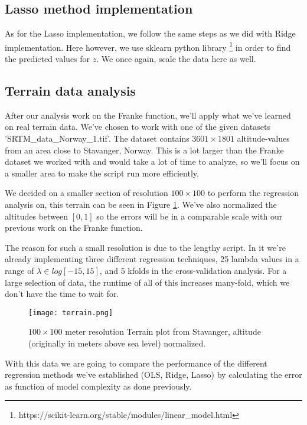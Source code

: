 \documentclass[reprint,english,notitlepage]{revtex4-1}  %
\begin{document}
\subsection{Lasso method implementation}
As for the Lasso implementation, we follow the same steps as we did with Ridge implementation. Here however, we use sklearn python library \footnote{https://scikit-learn.org/stable/modules/linear_model.html} in order to find the predicted values for $z$. We once again, scale the data here as well. 

\subsection{Terrain data analysis}

After our analysis work on the Franke function, we'll apply what we've learned on real terrain data. We've chosen to work with one of the given datasets 'SRTM\_data\_Norway\_1.tif'. The dataset contains $3601 \times 1801$ altitude-values from an area close to Stavanger, Norway. This is a lot larger than the Franke dataset we worked with and would take a lot of time to analyze, so we'll focus on a smaller area to make the script run more efficiently.

We decided on a smaller section of resolution $100 \times 100$ to perform the regression analysis on, this terrain can be seen in Figure \ref{fig:terrain}. We've also normalized the altitudes between $[0, 1]$ so the errors will be in a comparable scale with our previous work on the Franke function.

The reason for such a small resolution is due to the lengthy script. In it we're already implementing three different regression techniques, 25 lambda values in a range of $\lambda \in log[-15, 15]$, and 5 kfolds in the cross-validation analysis. For a large selection of data, the runtime of all of this increases many-fold, which we don't have the time to wait for.

\begin{figure}[h!]
    \centering
    \texttt{[image: terrain.png]}
    \caption{$100 \times 100$ meter resolution Terrain plot from Stavanger, altitude (originally in meters above sea level) normalized.}
    \label{fig:terrain}
\end{figure}

With this data we are going to compare the performance of the different regression methods we've established (OLS, Ridge, Lasso) by calculating the error as function of model complexity as done previously.
\end{document}
